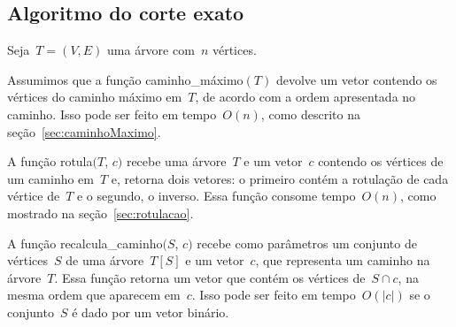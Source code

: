 	\bigskip
	\bigskip
	\bigskip
	\bigskip
	\bigskip

	\subsection{Algoritmo do corte exato}

		Seja~${T=(V,E)}$ uma árvore com~$n$ vértices.

		Assumimos que a função {\sc caminho\_máximo}$(T)$ 
		devolve um vetor contendo os vértices do caminho 
		máximo em~$T$, de acordo com a ordem apresentada no caminho.
		Isso pode ser feito em tempo~$O(n)$, como descrito na 
		seção~\ref{sec:caminhoMaximo}.

		A função {\sc rotula}$(T$, $c)$ recebe uma árvore~$T$ e um vetor~$c$
		contendo os vértices de um caminho em~$T$ e,
		retorna dois vetores: o primeiro contém a rotulação de cada vértice 
		de~$T$ e o segundo, o inverso. 
		Essa função consome tempo~$O(n)$, como mostrado na 
		seção~\ref{sec:rotulacao}.

		A função {\sc recalcula\_caminho}$(S$, $c)$
		recebe como parâmetros um conjunto de vértices~$S$ de uma árvore~$T[S]$ 
		e um vetor~$c$, que representa um caminho na árvore~$T$.
		Essa função retorna um vetor que contém os vértices de~$S\cap c$, na mesma 
		ordem que aparecem em~$c$. 
		Isso pode ser feito em tempo~$O(|c|)$ se 
		o conjunto~$S$ é dado por um vetor binário.





